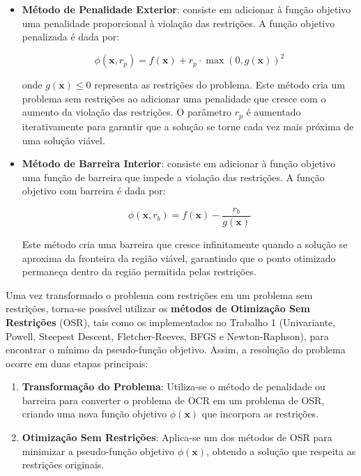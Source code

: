 \documentclass[a4paper, 12pt]{article}
\begin{document}
\begin{itemize}
    \item \textbf{Método de Penalidade Exterior}: consiste em adicionar à função objetivo uma penalidade proporcional à violação das restrições. A função objetivo penalizada é dada por:
      
      \begin{equation}
      \phi(\mathbf{x}, r_p) = f(\mathbf{x}) + r_p \cdot \max(0, g(\mathbf{x}))^2
      \end{equation}
      
      onde $g(\mathbf{x}) \leq 0$ representa as restrições do problema. Este método cria um problema sem restrições ao adicionar uma penalidade que cresce com o aumento da violação das restrições. O parâmetro $r_p$ é aumentado iterativamente para garantir que a solução se torne cada vez mais próxima de uma solução viável.

      \item \textbf{Método de Barreira Interior}: consiste em adicionar à função objetivo uma função de barreira que impede a violação das restrições. A função objetivo com barreira é dada por:
      
      \begin{equation}
      \phi(\mathbf{x}, r_b) = f(\mathbf{x}) - \frac{r_b}{g(\mathbf{x})}
      \end{equation}
    
      Este método cria uma barreira que cresce infinitamente quando a solução se aproxima da fronteira da região viável, garantindo que o ponto otimizado permaneça dentro da região permitida pelas restrições.
    
\end{itemize}



Uma vez transformado o problema com restrições em um problema sem restrições, torna-se possível utilizar os \textbf{métodos de Otimização Sem Restrições} (OSR), tais como os implementados no Trabalho 1 (Univariante, Powell, Steepest Descent, Fletcher-Reeves, BFGS e Newton-Raphson), para encontrar o mínimo da pseudo-função objetivo. Assim, a resolução do problema ocorre em duas etapas principais:

\begin{enumerate}
    \item \textbf{Transformação do Problema}: Utiliza-se o método de penalidade ou barreira para converter o problema de OCR em um problema de OSR, criando uma nova função objetivo $\phi(\mathbf{x})$ que incorpora as restrições.
    \item \textbf{Otimização Sem Restrições}: Aplica-se um dos métodos de OSR para minimizar a pseudo-função objetivo $\phi(\mathbf{x})$, obtendo a solução que respeita as restrições originais.

\end{enumerate}
\end{document}
